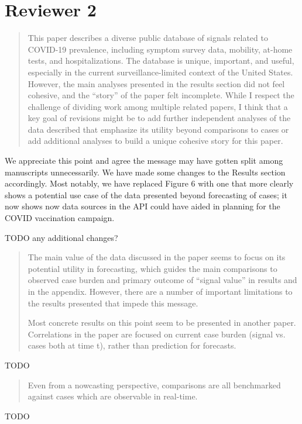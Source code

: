 \documentclass[11pt]{article}
\begin{document}
\section*{Reviewer 2}

\begin{quote}
  This paper describes a diverse public database of signals related to COVID-19
  prevalence, including symptom survey data, mobility, at-home tests, and
  hospitalizations. The database is unique, important, and useful, especially in
  the current surveillance-limited context of the United States. However, the
  main analyses presented in the results section did not feel cohesive, and the
  ``story'' of the paper felt incomplete. While I respect the challenge of
  dividing work among multiple related papers, I think that a key goal of
  revisions might be to add further independent analyses of the data described
  that emphasize its utility beyond comparisons to cases or add additional
  analyses to build a unique cohesive story for this paper.
\end{quote}
We appreciate this point and agree the message may have gotten split among
manuscripts unnecessarily. We have made some changes to the Results section
accordingly. Most notably, we have replaced Figure 6 with one that more clearly
shows a potential use case of the data presented beyond forecasting of cases; it
now shows now data sources in the API could have aided in planning for the COVID
vaccination campaign.

TODO any additional changes?

\begin{quote}
  The main value of the data discussed in the paper seems to focus on its
  potential utility in forecasting, which guides the main comparisons to
  observed case burden and primary outcome of ``signal value'' in results and in
  the appendix. However, there are a number of important limitations to the
  results presented that impede this message.

  Most concrete results on this point seem to be presented in another paper.
  Correlations in the paper are focused on current case burden (signal vs. cases
  both at time t), rather than prediction for forecasts.
\end{quote}
TODO

\begin{quote}
  Even from a nowcasting perspective, comparisons are all benchmarked against
  cases which are observable in real-time.
\end{quote}
TODO
\end{document}
